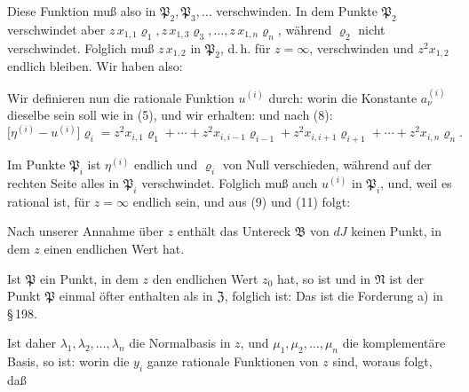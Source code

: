 Diese Funktion muß also in $\mathfrak P_2, \mathfrak P_3, \ldots$ verschwinden. In dem Punkte $\mathfrak P_2$ verschwindet aber $z\,x_{1,1}\varrho_1, z\,x_{1,3}\varrho_3, \ldots, z\,x_{1,n}\varrho_n$, während $\varrho_2$ nicht verschwindet. Folglich muß $z\,x_{1,2}$ in $\mathfrak P_2$, d.\,h. für $z=\infty$, verschwinden und $z^2 x_{1,2}$ endlich bleiben. Wir haben also:


Wir definieren nun die rationale Funktion $u^{(i)}$ durch:
worin die Konstante $a^{(i)}_\nu$ dieselbe sein soll wie in (5), und wir erhalten:
und nach (8):
\[
\bigl[\eta^{(i)} - u^{(i)}\bigr]\varrho_i = z^2 x_{i,1}\varrho_1 + \cdots + z^2 x_{i,i-1}\varrho_{i-1} + z^2 x_{i,i+1}\varrho_{i+1} + \cdots + z^2 x_{i,n}\varrho_n.
\]

Im Punkte $\mathfrak P_i$ ist $\eta^{(i)}$ endlich und $\varrho_i$ von Null verschieden, während auf der rechten Seite alles in $\mathfrak P_i$ verschwindet. Folglich muß auch $u^{(i)}$ in $\mathfrak P_i$, und, weil es rational ist, für $z=\infty$ endlich sein, und aus (9) und (11) folgt:

Nach unserer Annahme über $z$ enthält das Untereck $\mathfrak B$ von $dJ$ keinen Punkt, in dem $z$ einen endlichen Wert hat.

Ist $\mathfrak P$ ein Punkt, in dem $z$ den endlichen Wert $z_0$ hat, so ist
und in $\mathfrak N$ ist der Punkt $\mathfrak P$ einmal öfter enthalten als in $\mathfrak Z$, folglich ist:
Das ist die Forderung a) in \S\,198.

Ist daher $\lambda_1, \lambda_2, \ldots, \lambda_n$ die Normalbasis in $z$, und $\mu_1, \mu_2, \ldots, \mu_n$ die komplementäre Basis, so ist:
worin die $y_i$ ganze rationale Funktionen von $z$ sind, woraus folgt, daß
